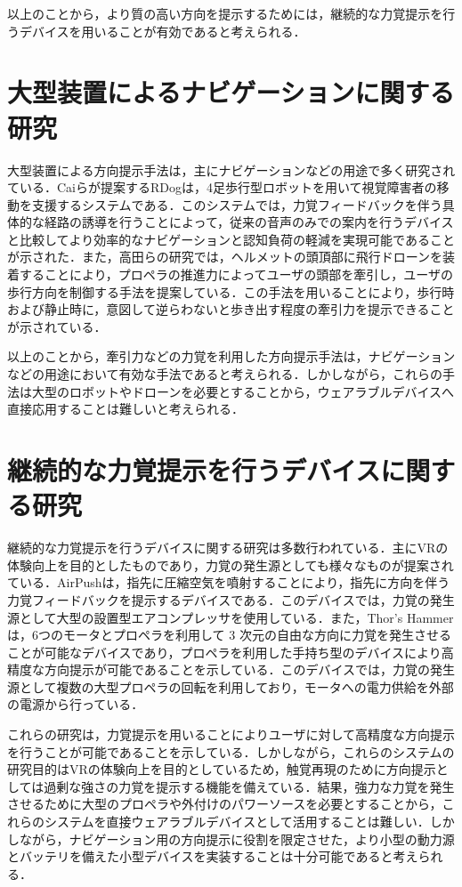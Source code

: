 \documentclass[a4paper,11pt]{jreport}
\begin{document}
以上のことから，より質の高い方向を提示するためには，継続的な力覚提示を行うデバイスを用いることが有効であると考えられる．

\section{大型装置によるナビゲーションに関する研究}
大型装置による方向提示手法は，主にナビゲーションなどの用途で多く研究されている．Caiらが提案するRDog\cite{cai2024rdog}は，4足歩行型ロボットを用いて視覚障害者の移動を支援するシステムである．このシステムでは，力覚フィードバックを伴う具体的な経路の誘導を行うことによって，従来の音声のみでの案内を行うデバイスと比較してより効率的なナビゲーションと認知負荷の軽減を実現可能であることが示された．また，高田らの研究\cite{takada2019propeller}では，ヘルメットの頭頂部に飛行ドローンを装着することにより，プロペラの推進力によってユーザの頭部を牽引し，ユーザの歩行方向を制御する手法を提案している．この手法を用いることにより，歩行時および静止時に，意図して逆らわないと歩き出す程度の牽引力を提示できることが示されている．

以上のことから，牽引力などの力覚を利用した方向提示手法は，ナビゲーションなどの用途において有効な手法であると考えられる．しかしながら，これらの手法は大型のロボットやドローンを必要とすることから，ウェアラブルデバイスへ直接応用することは難しいと考えられる．

\section{継続的な力覚提示を行うデバイスに関する研究}
継続的な力覚提示を行うデバイスに関する研究は多数行われている．主にVRの体験向上を目的としたものであり，力覚の発生源としても様々なものが提案されている．AirPush\cite{ma2024airpush}は，指先に圧縮空気を噴射することにより，指先に方向を伴う力覚フィードバックを提示するデバイスである．このデバイスでは，力覚の発生源として大型の設置型エアコンプレッサを使用している．また，Thor's Hammer\cite{heo2018thorshammer}は，6つのモータとプロペラを利用して 3 次元の自由な方向に力覚を発生させることが可能なデバイスであり，プロペラを利用した手持ち型のデバイスにより高精度な方向提示が可能であることを示している．このデバイスでは，力覚の発生源として複数の大型プロペラの回転を利用しており，モータへの電力供給を外部の電源から行っている．

これらの研究は，力覚提示を用いることによりユーザに対して高精度な方向提示を行うことが可能であることを示している．しかしながら，これらのシステムの研究目的はVRの体験向上を目的としているため，触覚再現のために方向提示としては過剰な強さの力覚を提示する機能を備えている．結果，強力な力覚を発生させるために大型のプロペラや外付けのパワーソースを必要とすることから，これらのシステムを直接ウェアラブルデバイスとして活用することは難しい．しかしながら，ナビゲーション用の方向提示に役割を限定させた，より小型の動力源とバッテリを備えた小型デバイスを実装することは十分可能であると考えられる．
\end{document}
